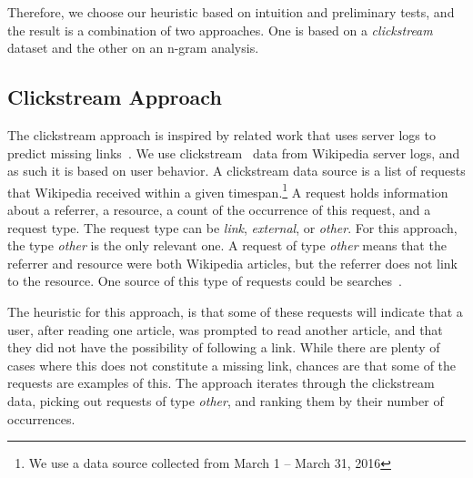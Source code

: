 


Therefore, we choose our heuristic based on intuition and preliminary tests, and the result is a combination of two approaches. One is based on a \emph{clickstream} dataset and the other on an n-gram analysis.

\subsection{Clickstream Approach}\label{sec:candidate_clickstream}

The clickstream approach is inspired by related work that uses server logs to predict missing links~\cite{hyperlink-structure-using-logs}. We use clickstream~\cite{wiki-clickstream} data from Wikipedia server logs, and as such it is based on user behavior. A clickstream data source is a list of requests that Wikipedia received within a given timespan.\footnote{We use a data source collected from March 1 -- March 31, 2016} A request holds information about a referrer, a resource, a count of the occurrence of this request, and a request type. The request type can be \emph{link}, \emph{external}, or \emph{other}. For this approach, the type \emph{other} is the only relevant one. A request of type \emph{other} means that the referrer and resource were both Wikipedia articles, but the referrer does not link to the resource. One source of this type of requests could be searches~\cite{wiki-clickstream}.

The heuristic for this approach, is that some of these requests will indicate that a user, after reading one article, was prompted to read another article, and that they did not have the possibility of following a link. While there are plenty of cases where this does not constitute a missing link, chances are that some of the requests are examples of this. The approach iterates through the clickstream data, picking out requests of type \emph{other}, and ranking them by their number of occurrences.

